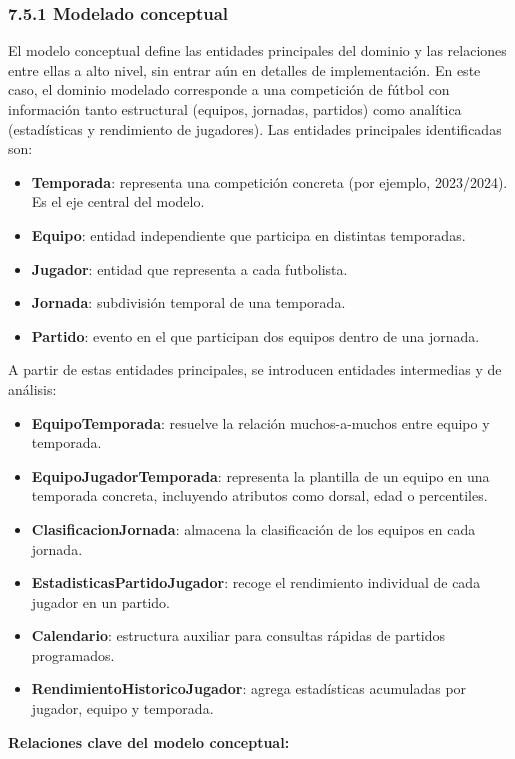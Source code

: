 \subsubsection{7.5.1 Modelado conceptual}
El modelo conceptual define las entidades principales del dominio y las
relaciones entre ellas a alto nivel, sin entrar aún en detalles de
implementación. En este caso, el dominio modelado corresponde a una competición
de fútbol con información tanto estructural (equipos, jornadas, partidos) como
analítica (estadísticas y rendimiento de jugadores).
Las entidades principales identificadas son:

\begin{itemize}
\item \textbf{Temporada}: representa una competición concreta (por ejemplo,
2023/2024). Es el eje central del modelo.
\item \textbf{Equipo}: entidad independiente que participa en distintas
temporadas.
\item \textbf{Jugador}: entidad que representa a cada futbolista.
\item \textbf{Jornada}: subdivisión temporal de una temporada.
\item \textbf{Partido}: evento en el que participan dos equipos dentro de una
jornada.
\end{itemize}

A partir de estas entidades principales, se introducen entidades intermedias y
de análisis:

\begin{itemize}
\item \textbf{EquipoTemporada}: resuelve la relación muchos-a-muchos entre
equipo y temporada.
\item \textbf{EquipoJugadorTemporada}: representa la plantilla de un equipo en
una temporada concreta, incluyendo atributos como dorsal, edad o percentiles.
\item \textbf{ClasificacionJornada}: almacena la clasificación de los equipos
en cada jornada.
\item \textbf{EstadisticasPartidoJugador}: recoge el rendimiento individual de
cada jugador en un partido.
\item \textbf{Calendario}: estructura auxiliar para consultas rápidas de
partidos programados.
\item \textbf{RendimientoHistoricoJugador}: agrega estadísticas acumuladas por
jugador, equipo y temporada.
\end{itemize}

\textbf{Relaciones clave del modelo conceptual:}

